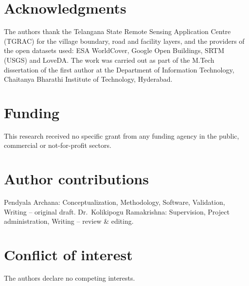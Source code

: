 \providecommand{\roles}[1]{#1}
\providecommand{\suppdata}[2]{#2 (\url{#1})}

\section*{Acknowledgments}
The authors thank the Telangana State Remote Sensing Application Centre (TGRAC) for the village boundary, road and facility layers, and the providers of the open datasets used: ESA WorldCover, Google Open Buildings, SRTM (USGS) and LoveDA. The work was carried out as part of the M.Tech dissertation of the first author at the Department of Information Technology, Chaitanya Bharathi Institute of Technology, Hyderabad.

\section*{Funding}
This research received no specific grant from any funding agency in the public, commercial or not-for-profit sectors.

\section*{Author contributions}
\roles{Pendyala Archana: Conceptualization, Methodology, Software, Validation, Writing -- original draft. Dr.~Kolikipogu Ramakrishna: Supervision, Project administration, Writing -- review \& editing.}

\section*{Conflict of interest}
The authors declare no competing interests.

